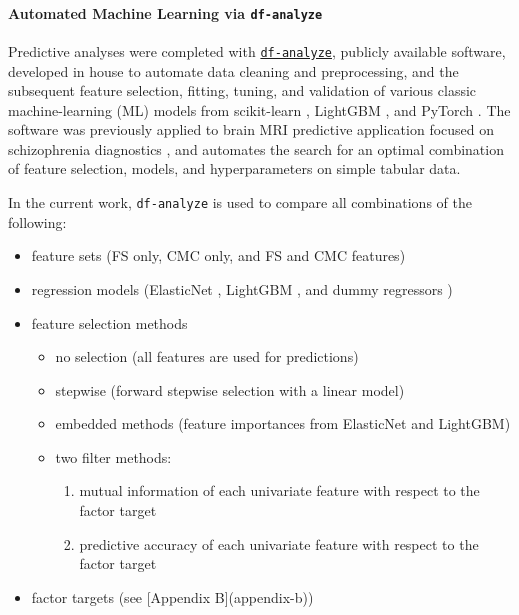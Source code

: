 \documentclass{article}
\begin{document}
\paragraph{Automated Machine Learning via \texttt{df-analyze}}


Predictive analyses were completed with
\href{github.com/stfxecutables/df-analyze}{\texttt{df-analyze}}, publicly
available software, developed in house to automate data cleaning and
preprocessing, and the subsequent feature selection, fitting, tuning, and
validation of various classic machine-learning (ML) models from scikit-learn
\citep{JMLR:v12:pedregosa11a}, LightGBM \citep{LightGBMNIPS2017} , and
PyTorch \citep{Ansel2024PyTorch}. The software was previously applied to
brain MRI predictive application focused on schizophrenia diagnostics
\citep{levmanMorphologicalStudySchizophrenia2022}, and automates the search
for an optimal combination of feature selection, models, and hyperparameters
on simple tabular data.

In the current work, \texttt{df-analyze} is used to compare all combinations
of the following:

\begin{itemize}
\item feature sets (FS only, CMC only, and FS and CMC features)
\item regression models (ElasticNet \citep{Zou2005,JMLR:v12:pedregosa11a},
LightGBM \citep{LightGBMNIPS2017}, and dummy regressors
\citep{JMLR:v12:pedregosa11a})
\item feature selection methods
	\begin{itemize}
		\item no selection (all features are used for predictions)
		\item stepwise (forward stepwise selection with a linear model)
		\item embedded methods (feature importances from ElasticNet and LightGBM)
		\item two filter methods:
		\begin{enumerate}
			\item mutual information of each univariate feature with respect to the
			factor target
			\item predictive accuracy of each univariate feature with respect to
			the factor target
		\end{enumerate}
	\end{itemize}
\item factor targets (see [Appendix B](appendix-b))
\end{itemize}
\end{document}

